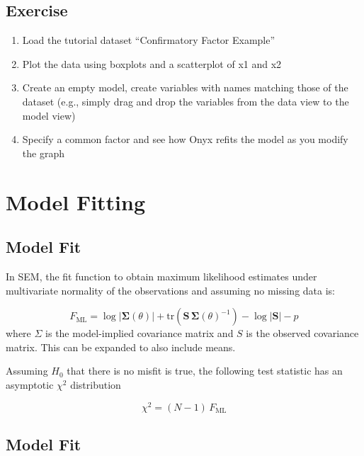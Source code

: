 \documentclass[
  letterpaper,
  DIV=11,
  numbers=noendperiod]{scrreprt}
\begin{document}
\section{Exercise}\label{exercise}

\begin{enumerate}
\def\labelenumi{\arabic{enumi}.}
\item
  Load the tutorial dataset ``Confirmatory Factor Example''
\item
  Plot the data using boxplots and a scatterplot of x1 and x2
\item
  Create an empty model, create variables with names matching those of
  the dataset (e.g., simply drag and drop the variables from the data
  view to the model view)
\item
  Specify a common factor and see how Onyx refits the model as you
  modify the graph
\end{enumerate}


\chapter{Model Fitting}\label{model-fitting}

\section{Model Fit}\label{model-fit}

In SEM, the fit function to obtain maximum likelihood estimates under
multivariate normality of the observations and assuming no missing data
is:

\[F_{\mathrm{ML}} = \log\lvert \boldsymbol{\Sigma}(\theta) \rvert 
+ \mathrm{tr}\left( \mathbf{S}\, \boldsymbol{\Sigma}(\theta)^{-1} \right) 
- \log\lvert \mathbf{S} \rvert - p\] where \(\Sigma\) is the
model-implied covariance matrix and \(S\) is the observed covariance
matrix. This can be expanded to also include means.

Assuming \(H_0\) that there is no misfit is true, the following test
statistic has an asymptotic \(\chi^2\) distribution

\[\chi^2 = (N - 1)\,F_{\mathrm{ML}}\]

\section{Model Fit}\label{model-fit-1}
\end{document}
